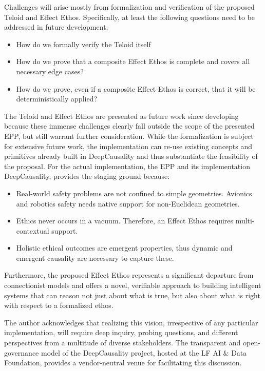 \documentclass{article}
\begin{document}
Challenges will arise mostly from formalization and verification of the proposed Teloid and Effect Ethos. Specifically,
at least the following questions need to be addressed in future development:

\begin{itemize}
    \item How do we formally verify the Teloid itself
    \item How do we prove that a composite Effect Ethos is complete and covers all necessary edge cases?
    \item How do we prove, even if a composite Effect Ethos is correct, that it will be deterministically applied?
\end{itemize}

\newpage

The Teloid and Effect Ethos are presented as future work since developing because these immense challenges clearly
fall outside the scope of the presented EPP, but still warrant further consideration. 
While the formalization is
subject for extensive future work, the implementation can re-use existing concepts and primitives already built in
DeepCausality and thus substantiate the feasibility of the proposal. For the actual implementation, the EPP and its
implementation DeepCausality, provides the staging ground because:

\begin{itemize}
    \item Real-world safety problems are not confined to simple geometries. Avionics and robotics safety needs native support
  for non-Euclidean geometries.
    \item Ethics never occurs in a vacuum. Therefore, an Effect Ethos requires multi-contextual support.
    \item Holistic ethical outcomes are emergent properties, thus dynamic and emergent causality are necessary to capture these.
\end{itemize}

Furthermore, the proposed Effect Ethos represents a significant departure from connectionist models and offers a novel,
verifiable approach to building intelligent systems that can reason not just about what is true, but also about what is
right with respect to a formalized ethos.

The author acknowledges that realizing this vision, irrespective of any particular implementation, will require deep
inquiry, probing questions, and different perspectives from a multitude of diverse stakeholders. The transparent and
open-governance model of the DeepCausality project, hosted at the LF AI \& Data Foundation, provides a vendor-neutral
venue for facilitating this discussion.
\end{document}
